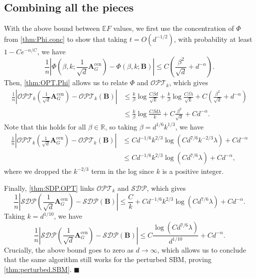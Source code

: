 \documentclass[11pt, titlepage]{article} %
\numberwithin{equation}{section}
\theoremstyle{definition}
\numberwithin{theorem}{section}
\numberwithin{lemma}{section}
\numberwithin{corollary}{section}
\numberwithin{proposition}{section}
\numberwithin{definition}{section}
\numberwithin{remark}{section}
\begin{document}
\subsection{Combining all the pieces}
With the above bound between $\mathbb{E}F$ values, we first use the concentration of $\Phi$ from
\cref{thm:Phi.conc} to show that taking $t = O(d^{-1/2})$, with probability at least $1 - Ce^{-n/C}$,
we have
\[
\frac{1}{n} \left| \Phi\left(\beta, k; \frac{1}{\sqrt{d}}\bm{A}^\mathrm{cen}_{G}\right) 
- \Phi(\beta, k; \bm{B})\right| \leq C\left(\frac{\beta^2}{\sqrt{d}} + d^{-\alpha}\right).
\]
Then, \cref{thm:OPT.Phi} allows us to relate $\Phi$ and $\mathcal{OPT}_k$, which gives
\begin{align*}
\frac{1}{n} \left|\mathcal{OPT}_k\left(\frac{1}{\sqrt{d}}\bm{A}^\mathrm{cen}_{G}\right)
- \mathcal{OPT}_k(\bm{B})\right| &\leq \frac{k}{\beta} \log \frac{C\beta d}{\sqrt{k}} 
+ \frac{k}{\beta} \log \frac{C\beta \lambda}{\sqrt{k}} + C\left(\frac{\beta^2}{\sqrt{d}} + d^{-\alpha}\right)\\
&\leq \frac{k}{\beta} \log \frac{C\beta d\lambda}{k} + C\frac{\beta^2}{\sqrt{d}} + C d^{-\alpha}.
\end{align*}
Note that this holds for all $\beta \in \mathbb{R}$, so taking $\beta = d^{1/6} k^{1/3}$, we have
\begin{align*}
\frac{1}{n} \left|\mathcal{OPT}_k\left(\frac{1}{\sqrt{d}}\bm{A}^\mathrm{cen}_{G}\right)
- \mathcal{OPT}_k(\bm{B})\right| &\leq C d^{-1/6} k^{2/3} \log(Cd^{7/6} k^{-2/3} \lambda) + C d^{-\alpha}\\
&\leq C d^{-1/6} k^{2/3} \log(Cd^{7/6} \lambda) + C d^{-\alpha},
\end{align*}
where we dropped the $k^{-2/3}$ term in the log since $k$ is a positive integer.

Finally, \cref{thm:SDP.OPT} links $\mathcal{OPT}_k$ and $\mathcal{SDP}$, which gives
\[
\frac{1}{n} \left|\mathcal{SDP}\left(\frac{1}{\sqrt{d}}\bm{A}^\mathrm{cen}_{G}\right)
- \mathcal{SDP}(\bm{B})\right| \leq \frac{C}{k} + C d^{-1/6} k^{2/3} \log(Cd^{7/6} \lambda) + C d^{-\alpha}.
\]
Taking $k = d^{1/10}$, we have
\[
\frac{1}{n} \left|\mathcal{SDP}\left(\frac{1}{\sqrt{d}}\bm{A}^\mathrm{cen}_{G}\right)
- \mathcal{SDP}(\bm{B})\right| \leq C \frac{\log(Cd^{7/6}\lambda)}{d^{1/10}} + C d^{-\alpha}.
\]
Crucially, the above bound goes to zero as $d \to \infty$, which allows us to conclude that the same
algorithm still works for the perturbed SBM, proving \cref{thm:perturbed.SBM}. \hfill $\blacksquare$
\end{document}
